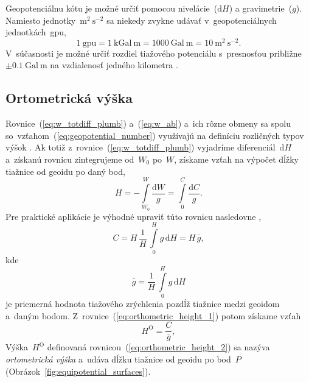 \documentclass[a4paper, 12pt]{book}
\newcommand{\diff}{\mathrm d}
\begin{document}
Geopotenciálnu kótu je možné určiť pomocou nivelácie~($\diff H$) 
a gravimetrie~($g$).  Namiesto jednotky~$\mathrm{m}^2\ \mathrm{s}^{-2}$ sa 
niekedy zvykne udávať v~geopotenciálnych jednotkách~gpu,
%
\begin{equation}
\label{eq:gpu_unit}
1\ \mathrm{gpu} = 1\ \mathrm{kGal} \ \mathrm{m} = 1000\ \mathrm{Gal}\ 
\mathrm{m} = 10\ \mathrm{m}^2 \ \mathrm{s}^{-2}{.}
\end{equation}
%
V~súčasnosti je možné určiť rozdiel tiažového potenciálu s~presnosťou približne 
$\pm 0.1\ \mathrm{Gal} \ \mathrm{m}$ na vzdialenosť jedného kilometra 
\parencite{MoritzPhysicalGeodesy}.

\subsection{Ortometrická výška}
\label{sec:orthometric_height}

Rovnice~(\ref{eq:w_totdiff_plumb}) a~(\ref{eq:w_ab}) a~ich rôzne obmeny sa 
spolu so~vzťahom~(\ref{eq:geopotential_number}) využívajú na definíciu 
rozličných typov výšok 
\parencite{Jekeli2000a,MoritzPhysicalGeodesy,SansoGeodeticHeights}.  Ak totiž 
z~rovnice~(\ref{eq:w_totdiff_plumb}) vyjadríme diferenciál~$\diff H$ a~získanú 
rovnicu zintegrujeme od~$W_0$ po~$W$, získame vzťah na výpočet dĺžky tiažnice 
od geoidu po daný bod,
%
\begin{equation}
\label{eq:orthometric_height_1}
H = -\int\limits_{W_0}^{W} \frac{\diff W}{g} = \int\limits_{0}^{C} \frac{\diff 
C}{g}{.}
\end{equation}
%
Pre praktické aplikácie je výhodné upraviť túto rovnicu nasledovne 
\parencite{MoritzPhysicalGeodesy},
%
\begin{equation}
C = H \, \frac{1}{H} \, \int\limits_0^H g \, \diff H = H \, \bar{g}{,}
\end{equation}
%
kde
%
\begin{equation}
\label{eq:mean_g_plumbline}
\bar{g} = \frac{1}{H} \, \int\limits_0^H g \, \diff H
\end{equation}
%
je priemerná hodnota tiažového zrýchlenia pozdĺž tiažnice medzi geoidom a~daným 
bodom.  Z~rovnice~(\ref{eq:orthometric_height_1}) potom získame vzťah
%
\begin{equation}
\label{eq:orthometric_height_2}
H^\mathrm{O} = \frac{C}{\bar{g}}{,}
\end{equation}
%
Výška~$H^\mathrm{O}$ definovaná rovnicou~(\ref{eq:orthometric_height_2}) sa 
nazýva \emph{ortometrická výška} a~udáva dĺžku tiažnice od geoidu po bod~$P$ 
(Obrázok~\ref{fig:equipotential_surfaces}).
\end{document}
